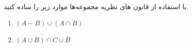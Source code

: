 با استفاده از قانون های نظریه مجموعه‌ها موارد زیر را ساده کنید.

\begin{enumerate}
	\item[] $(A - B) \cup (A \cap B)$
	\item[] $\overline{\overline{(A \cup B) \cap C} \cup \overline{B}}$
\end{enumerate}